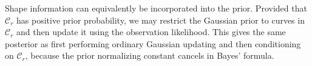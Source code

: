 Shape information can equivalently be incorporated into the prior.
Provided that $\mathcal C_r$ has positive prior probability, we may
restrict the Gaussian prior to curves in $\mathcal C_r$ and then update
it using the observation likelihood. This gives the same posterior as
first performing ordinary Gaussian updating and then conditioning on
$\mathcal C_r$, because the prior normalizing constant cancels in
Bayes' formula.
